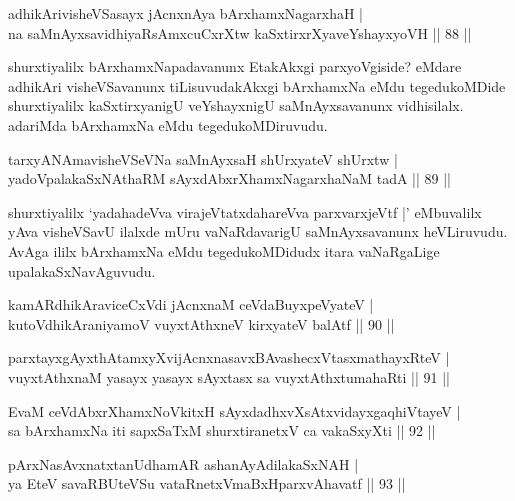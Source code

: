 
\begin{shl}
adhikArivisheVSasayx jAcnxnAya bArxhamxNagarxhaH |\\
na saMnAyxsavidhiyaRsAmxcuCxrXtw kaSxtirxrXyaveYshayxyoVH \hfill || 88 ||
\end{shl}

\begin{artha}
shurxtiyalilx bArxhamxNapadavanunx EtakAkxgi parxyoVgiside? eMdare adhikAri visheVSavanunx tiLisuvudakAkxgi bArxhamxNa eMdu tegedukoMDide shurxtiyalilx kaSxtirxyanigU veYshayxnigU saMnAyxsavanunx vidhisilalx. adariMda bArxhamxNa eMdu tegedukoMDiruvudu.
\end{artha}


\begin{shl}
tarxyANAmavisheVSeVNa saMnAyxsaH shUrxyateV shUrxtw |\\
yadoVpalakaSxNAthaRM sAyxdAbxrXhamxNagarxhaNaM tadA \hfill || 89 ||
\end{shl}

\begin{artha}
shurxtiyalilx `yadahadeVva virajeVtatxdahareVva parxvarxjeVtf |' eMbuvalilx yAva visheVSavU ilalxde mUru vaNaRdavarigU saMnAyxsavanunx heVLiruvudu. AvAga ililx bArxhamxNa eMdu tegedukoMDidudx itara vaNaRgaLige upalakaSxNavAguvudu.
\end{artha}

\begin{shl}
kamARdhikAraviceCxVdi jAcnxnaM ceVdaBuyxpeVyateV |\\
kutoV\s dhikAraniyamoV vuyxtAthxneV kirxyateV balAtf \hfill || 90 ||
\end{shl}

\begin{shl}
parxtayxgAyxthAtamxyXvijAcnxnasavxBAvashecxVtasxmathayxRteV |\\
vuyxtAthxnaM yasayx yasayx sAyxtasx sa vuyxtAthxtumahaRti \hfill || 91 ||
\end{shl}

\begin{shl}
EvaM ceVdAbxrXhamxNoVkitxH sAyxdadhxvXsAtxvidayxgaqhiVtayeV |\\
sa bArxhamxNa iti sapxSaTxM shurxtiranetxV ca vakaSxyXti \hfill || 92 ||
\end{shl}

\begin{shl}
pArxNasAvxnatxtanUdhamAR ashanAyAdilakaSxNAH |\\
ya EteV savaRBUteVSu vataRnetxV\s maBxHparxvAhavatf \hfill || 93 ||
\end{shl}

